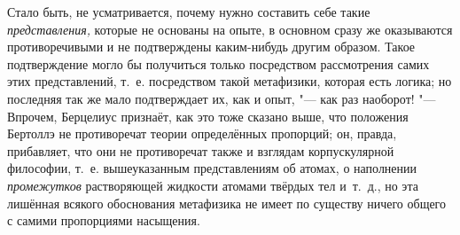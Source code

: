 Стало быть, не усматривается, почему нужно составить себе такие
{\em представления,} которые не основаны на опыте, в основном сразу же
оказываются противоречивыми и не подтверждены каким-нибудь другим образом.
Такое подтверждение могло бы получиться только посредством рассмотрения самих
этих представлений, т.~е. посредством такой метафизики, которая есть логика; но
последняя так же мало подтверждает их, как и опыт, "--- как раз наоборот! "---
Впрочем, Берцелиус признаёт, как это тоже сказано выше, что положения Бертоллэ
не противоречат теории определённых пропорций; он, правда, прибавляет, что они
не противоречат также и взглядам корпускулярной философии, т.~е. вышеуказанным
представлениям об атомах, о наполнении {\em промежутков} растворяющей жидкости
атомами твёрдых тел и~т.~д., но эта лишённая всякого обоснования метафизика не
имеет по существу ничего общего с самими пропорциями насыщения.

